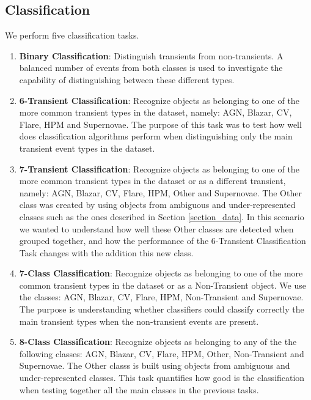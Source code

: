 \documentclass[a4paper,fleqn,usenatbib]{mnras}
\begin{document}
\subsection{Classification} \label{subsection_classification}

We perform five classification tasks.

\begin{enumerate}
\item \textbf{Binary Classification}: 
  Distinguish transients from non-transients. A balanced number of
  events from both classes is used to investigate the capability of
  distinguishing between these different types. 
\item \textbf{6-Transient Classification}: Recognize objects as
  belonging to one of the more common transient types in the dataset,
  namely: AGN, Blazar, CV, Flare, HPM and Supernovae. The purpose of
  this task was to test how well does classification algorithms perform
  when distinguishing only the main transient event types in the
  dataset. 
\item \textbf{7-Transient Classification}: Recognize objects as
  belonging to one of the more common transient types in the dataset
  or as a different transient, namely: AGN, Blazar, CV, Flare, HPM,
  Other and Supernovae. The Other class was created by using objects
  from ambiguous and under-represented classes such as the ones
  described in Section \ref{section_data}. In this scenario we wanted
  to understand how well these Other classes are detected when
  grouped together, and how the performance of the 6-Transient
  Classification Task changes with the addition this new class. 
    \item \textbf{7-Class Classification}: Recognize objects as
      belonging to one of the more common transient types in the
      dataset or as a Non-Transient object. We use the classes:
      AGN, Blazar, CV, Flare, HPM, Non-Transient and Supernovae. 
      The purpose is understanding whether classifiers could classify
      correctly the main transient types when the non-transient events
      are present.  
    \item \textbf{8-Class Classification}: Recognize objects as
      belonging to any of the the following classes: AGN, Blazar, CV,
      Flare, HPM, Other, Non-Transient and Supernovae. 
      The Other classs is built using objects from ambiguous and
      under-represented classes. 
      This task quantifies how good is the classification when testing
      together all the main classes in the previous tasks.
\end{enumerate}
\end{document}
